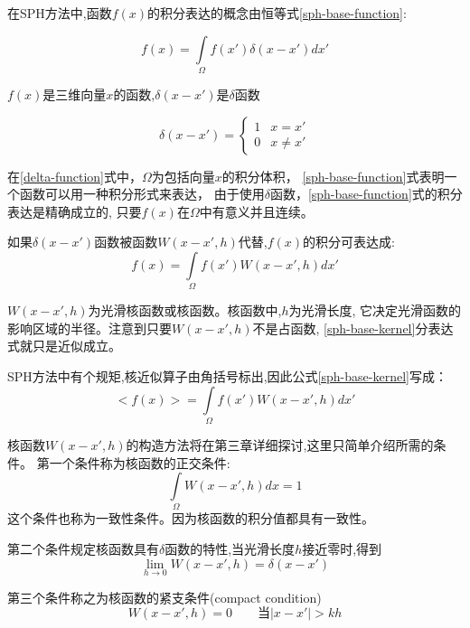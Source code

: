 在SPH方法中,函数$f(x)$的积分表达的概念由恒等式\ref{sph-base-function}:

\begin{equation}
\label{sph-base-function}
f(x) = \int\limits_\Omega{}f(x')\delta(x-x')dx'
\end{equation}

$f(x)$是三维向量$x$的函数,$\delta(x-x')$是$\delta$函数

\begin{equation}
\label{delta-function}
\delta(x-x') = \left\{
\begin{array}{rl}
1 & x = x'\\
0 & x \ne x' 
\end{array} \right.
\end{equation}

在\ref{delta-function}式中，$\Omega$为包括向量$x$的积分体积，
\ref{sph-base-function}式表明一个函数可以用一种积分形式来表达，
由于使用$\delta$函数，\ref{sph-base-function}式的积分表达是精确成立的,
只要$f(x)$在$\Omega$中有意义并且连续。

如果$\delta(x-x')$函数被函数$W(x-x',h)$代替,$f(x)$的积分可表达成:
\begin{equation}
\label{sph-base-kernel}
f(x)=\int\limits_\Omega{}f(x')W(x-x',h)dx'
\end{equation}

$W(x-x',h)$为光滑核函数或核函数。核函数中,$h$为光滑长度,
它决定光滑函数的影响区域的半径。注意到只要$W(x-x',h)$不是占函数,
\ref{sph-base-kernel}分表达式就只是近似成立。

SPH方法中有个规矩,核近似算子由角括号标出,因此公式\ref{sph-base-kernel}写成：
\begin{equation}
\label{sph-base-kernel:s}
< f(x) >=\int\limits_\Omega{}f(x')W(x-x',h)dx'
\end{equation}

核函数$W(x-x',h)$的构造方法将在第三章详细探讨,这里只简单介绍所需的条件。
第一个条件称为核函数的正交条件:
\begin{equation}
\label{kernel-function-condition1}
\int\limits_\Omega{}W(x-x',h)dx = 1
\end{equation}
这个条件也称为一致性条件。因为核函数的积分值都具有一致性。

第二个条件规定核函数具有$\delta$函数的特性,当光滑长度$h$接近零时,得到
\begin{equation}
\label{kernel-function-condition2}
\lim_{h \rightarrow 0}W(x-x',h) = \delta(x-x')
\end{equation}

第三个条件称之为核函数的紧支条件(compact condition)
\begin{equation}
\label{kernel-function-condition3}
W(x-x',h) = 0 \qquad \text{当}|x-x'| > kh
\end{equation}



















